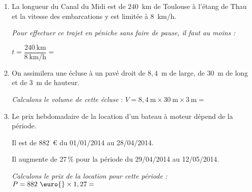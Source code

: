 
\medskip
 
\begin{enumerate}
\item La longueur du Canal du Midi est de $240$~km de Toulouse à l'étang de Thau et la vitesse des embarcations y est limitée à $8$~km/h. 

\textit{Pour effectuer ce trajet en péniche sans faire de pause, il faut au moins :}

$t=\dfrac{240~\text{km}}{8~\text{km/h}}=$
\item On assimilera une écluse à un pavé droit de $8,4$~m de large, de $30$~m de long et de $3$~m de hauteur. 

\textit{Calculons le volume de cette écluse }: $V=8,4~\text{m}\times 30~\text{m}\times 3~\text{m}=$
\item Le prix hebdomadaire de la location d'un bateau à moteur dépend de la période.
 
Il est de 882~\euro{} du 01/01/2014 au 28/04/2014.
 
Il augmente de 27\,\% pour la période du 29/04/2014 au 12/05/2014.
 
\textit{Calculons le prix de la location pour cette période :} $P=882\text{~\euro{}} \times 1,27=$
\end{enumerate}
 
\vspace{0,5cm}

